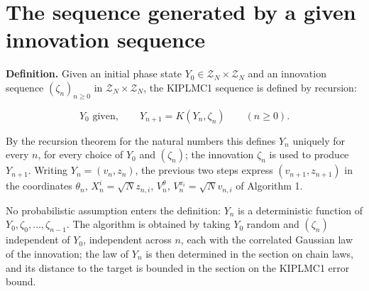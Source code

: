 \documentclass[11pt,a4paper]{article}
\begin{document}
\section{\texorpdfstring{The sequence generated by a given innovation sequence}{The sequence generated by a given innovation sequence}}


\textbf{Definition.} Given an initial phase state \(Y_0\in\mathcal Z_N\times\mathcal Z_N\) and an innovation sequence \((\zeta_n)_{n\ge0}\) in \(\mathcal Z_N\times\mathcal Z_N\), the KIPLMC1 sequence is defined by recursion:


\[Y_0\text{ given},\qquad Y_{n+1}=K(Y_n,\zeta_n)\qquad(n\ge0).\]


By the recursion theorem for the natural numbers this defines \(Y_n\) uniquely for every \(n\), for every choice of \(Y_0\) and \((\zeta_n)\); the innovation \(\zeta_n\) is used to produce \(Y_{n+1}\). Writing \(Y_n=(v_n,z_n)\), the previous two steps express \((v_{n+1},z_{n+1})\) in the coordinates \(\theta_n\), \(X^i_n=\sqrt Nz_{n,i}\), \(V^\theta_n\), \(V^{x_i}_n=\sqrt Nv_{n,i}\) of Algorithm 1.




No probabilistic assumption enters the definition: \(Y_n\) is a deterministic function of \(Y_0,\zeta_0,\dots,\zeta_{n-1}\). The algorithm is obtained by taking \(Y_0\) random and \((\zeta_n)\) independent of \(Y_0\), independent across \(n\), each with the correlated Gaussian law of the innovation; the law of \(Y_n\) is then determined in the section on chain laws, and its distance to the target is bounded in the section on the KIPLMC1 error bound.
\end{document}
